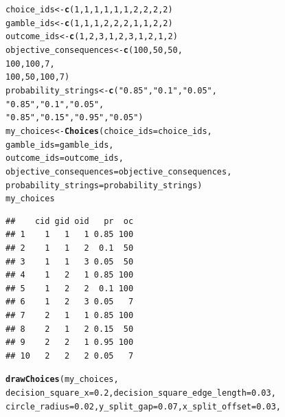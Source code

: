 \documentclass{article}\usepackage[]{graphicx}\usepackage[]{color}
\makeatletter
\newcommand{\hlnum}[1]{\textcolor[rgb]{0.686,0.059,0.569}{#1}}%
\newcommand{\hlstr}[1]{\textcolor[rgb]{0.192,0.494,0.8}{#1}}%
\newcommand{\hlstd}[1]{\textcolor[rgb]{0.345,0.345,0.345}{#1}}%
\newcommand{\hlkwb}[1]{\textcolor[rgb]{0.69,0.353,0.396}{#1}}%
\newcommand{\hlkwc}[1]{\textcolor[rgb]{0.333,0.667,0.333}{#1}}%
\newcommand{\hlkwd}[1]{\textcolor[rgb]{0.737,0.353,0.396}{\textbf{#1}}}%
\newenvironment{kframe}{%
 \def\at@end@of@kframe{}%
 \ifinner\ifhmode%
  \def\at@end@of@kframe{\end{minipage}}%
  \begin{minipage}{\columnwidth}%
 \fi\fi%
 \def\FrameCommand##1{\hskip\@totalleftmargin \hskip-\fboxsep
 \colorbox{shadecolor}{##1}\hskip-\fboxsep
     \hskip-\linewidth \hskip-\@totalleftmargin \hskip\columnwidth}%
 \MakeFramed {\advance\hsize-\width
   \@totalleftmargin\z@ \linewidth\hsize
   \@setminipage}}%
 {\par\unskip\endMakeFramed%
 \at@end@of@kframe}
\newenvironment{knitrout}{}{} %
\makeatother
\begin{document}
\begin{knitrout}
\color{fgcolor}\begin{kframe}
\begin{alltt}
\hlstd{choice_ids} \hlkwb{<-} \hlkwd{c}\hlstd{(}\hlnum{1}\hlstd{,} \hlnum{1}\hlstd{,} \hlnum{1}\hlstd{,} \hlnum{1}\hlstd{,} \hlnum{1}\hlstd{,} \hlnum{1}\hlstd{,} \hlnum{2}\hlstd{,} \hlnum{2}\hlstd{,} \hlnum{2}\hlstd{,} \hlnum{2}\hlstd{)}
\hlstd{gamble_ids} \hlkwb{<-} \hlkwd{c}\hlstd{(}\hlnum{1}\hlstd{,} \hlnum{1}\hlstd{,} \hlnum{1}\hlstd{,} \hlnum{2}\hlstd{,} \hlnum{2}\hlstd{,} \hlnum{2}\hlstd{,} \hlnum{1}\hlstd{,} \hlnum{1}\hlstd{,} \hlnum{2}\hlstd{,} \hlnum{2}\hlstd{)}
\hlstd{outcome_ids} \hlkwb{<-} \hlkwd{c}\hlstd{(}\hlnum{1}\hlstd{,} \hlnum{2}\hlstd{,} \hlnum{3}\hlstd{,} \hlnum{1}\hlstd{,} \hlnum{2}\hlstd{,} \hlnum{3}\hlstd{,} \hlnum{1}\hlstd{,} \hlnum{2}\hlstd{,} \hlnum{1}\hlstd{,} \hlnum{2}\hlstd{)}
\hlstd{objective_consequences} \hlkwb{<-} \hlkwd{c}\hlstd{(}\hlnum{100}\hlstd{,} \hlnum{50}\hlstd{,} \hlnum{50}\hlstd{,}
        \hlnum{100}\hlstd{,} \hlnum{100}\hlstd{,} \hlnum{7}\hlstd{,}
        \hlnum{100}\hlstd{,} \hlnum{50}\hlstd{,} \hlnum{100}\hlstd{,} \hlnum{7}\hlstd{)}
\hlstd{probability_strings} \hlkwb{<-} \hlkwd{c}\hlstd{(}\hlstr{"0.85"}\hlstd{,} \hlstr{"0.1"}\hlstd{,} \hlstr{"0.05"}\hlstd{,}
        \hlstr{"0.85"}\hlstd{,} \hlstr{"0.1"}\hlstd{,} \hlstr{"0.05"}\hlstd{,}
        \hlstr{"0.85"}\hlstd{,} \hlstr{"0.15"}\hlstd{,} \hlstr{"0.95"}\hlstd{,} \hlstr{"0.05"}\hlstd{)}
\hlstd{my_choices} \hlkwb{<-} \hlkwd{Choices}\hlstd{(}\hlkwc{choice_ids}\hlstd{=choice_ids,}
        \hlkwc{gamble_ids}\hlstd{=gamble_ids,}
        \hlkwc{outcome_ids}\hlstd{=outcome_ids,}
        \hlkwc{objective_consequences}\hlstd{=objective_consequences,}
        \hlkwc{probability_strings}\hlstd{=probability_strings)}
\hlstd{my_choices}
\end{alltt}
\begin{verbatim}
##    cid gid oid   pr  oc
## 1    1   1   1 0.85 100
## 2    1   1   2  0.1  50
## 3    1   1   3 0.05  50
## 4    1   2   1 0.85 100
## 5    1   2   2  0.1 100
## 6    1   2   3 0.05   7
## 7    2   1   1 0.85 100
## 8    2   1   2 0.15  50
## 9    2   2   1 0.95 100
## 10   2   2   2 0.05   7
\end{verbatim}
\begin{alltt}
\hlkwd{drawChoices}\hlstd{(my_choices,}
        \hlkwc{decision_square_x}\hlstd{=}\hlnum{0.2}\hlstd{,} \hlkwc{decision_square_edge_length}\hlstd{=}\hlnum{0.03}\hlstd{,}
        \hlkwc{circle_radius}\hlstd{=}\hlnum{0.02}\hlstd{,} \hlkwc{y_split_gap}\hlstd{=}\hlnum{0.07}\hlstd{,} \hlkwc{x_split_offset}\hlstd{=}\hlnum{0.03}\hlstd{,}

\end{alltt}
\end{kframe}
\end{knitrout}
\end{document}
